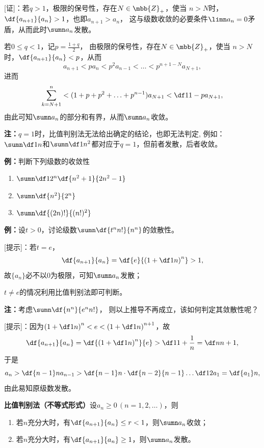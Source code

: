 [证]：若$q>1$，极限的保号性，存在$N\in\mbb{Z}_+$，使当
$n>N$时，$\df{a_{n+1}}{a_n}>1$，也即$a_{n+1}>a_n$，
这与级数收敛的必要条件$\limn a_n=0$矛盾，从而此时$\sumn a_n$发散。

若$0\leq q<1$，记$p=\frac{1+q}2$，
由极限的保号性，存在$N\in\mbb{Z}_+$，使当
$n>N$时，$\df{a_{n+1}}{a_n}<p$，从而
$$a_{n+1}<p{a_n}<p^2a_{n-1}<\ldots<p^{n+1-N}a_{N+1},$$
进而
$$\sum\limits_{k=N+1}^{n}<(1+p+p^2+\ldots+p^{n-1})a_{N+1}
<\df1{1-p}a_{N+1},$$
由此可知$\sumn a_n$的部分和有界，从而$\sumn a_n$收敛。\fin

{\bf 注：}$q=1$时，比值判别法无法给出确定的结论，也即{\kaishu 无法判定},
例如：$\sumn\df 1n$和$\sumn\df 1{n^2}$都对应于$q=1$，但前者发散，后者收敛。

{\bf 例：}判断下列级数的收敛性
\begin{enumerate} [(1)]
  \setlength{\itemindent}{1cm}
  \item $\sumn\df 1{2^n}\df{n^2+1}{2n^2-1}$ 
  \item $\sumn\df{n^2}{2^n}$ 
  \item $\sumn\df{(2n)!}{(n!)^2}$
\end{enumerate}

{\bf 例：}设$t>0$，讨论级数$\sumn\df{t^nn!}{n^n}$的敛散性。

[提示]：若$t=e$，
$$\df{a_{n+1}}{a_n}=\df{e}{\left(1+\df1n\right)^n}>1,$$
故$\{a_n\}$必不以$0$为极限，可知$\sumn a_n$发散；

$t\ne e$的情况利用比值判别法即可判断。

{\bf 注：}考虑$\sumn\df{n^n}{e^nn!}$，
则以上推导不再成立，该如何判定其敛散性呢？

[提示]：因为$\left(1+\df1n\right)^n<e<\left(1+\df1n\right)^{n+1}$，故
$$\df{a_{n+1}}{a_n}=\df{\left(1+\df1n\right)^n}{e}>\df1{1+\frac1n}=\df n{n+1},$$
于是
$$a_n>\df{n-1}na_{n-1}>\df{n-1}n\cdot\df{n-2}{n-1}\ldots\df12a_1=\df{a_1}n,$$
由此易知原级数发散。

\begin{thx}
	{\bf 比值判别法（不等式形式）}设$a_n\geq 0\,(n=1,2,\ldots)$，则 
	\begin{enumerate}
	  \setlength{\itemindent}{1cm}
	  \item 若$n$充分大时，有$\df{a_{n+1}}{a_n}\leq r<1$，则$\sumn a_n$收敛； 
	  \item 若$n$充分大时，有$\df{a_{n+1}}{a_n}\geq 1$，则$\sumn a_n$发散。
	\end{enumerate}
\end{thx}

